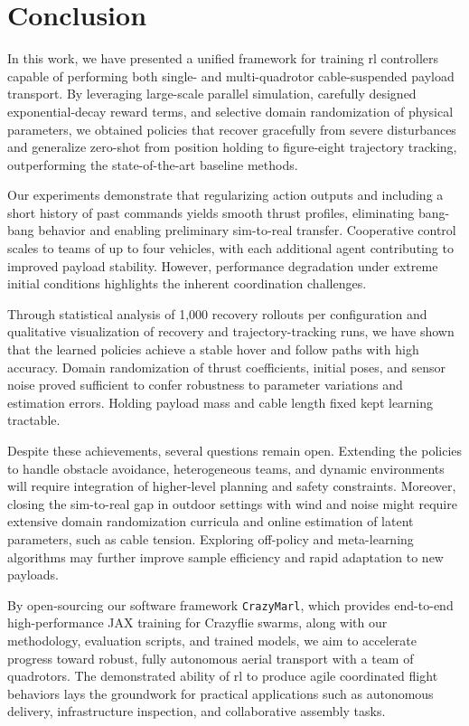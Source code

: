 \chapter{Conclusion}

In this work, we have presented a unified framework for training \gls{rl} controllers capable of performing both single- and multi-quadrotor cable-suspended payload transport. By leveraging large-scale parallel simulation, carefully designed exponential-decay reward terms, and selective domain randomization of physical parameters, we obtained policies that recover gracefully from severe disturbances and generalize zero-shot from position holding to figure-eight trajectory tracking, outperforming the state-of-the-art baseline methods.

Our experiments demonstrate that regularizing action outputs and including a short history of past commands yields smooth thrust profiles, eliminating bang-bang behavior and enabling preliminary sim-to-real transfer. Cooperative control scales to teams of up to four vehicles, with each additional agent contributing to improved payload stability. However, performance degradation under extreme initial conditions highlights the inherent coordination challenges.

Through statistical analysis of 1,000 recovery rollouts per configuration and qualitative visualization of recovery and trajectory-tracking runs, we have shown that the learned policies achieve a stable hover and follow paths with high accuracy. Domain randomization of thrust coefficients, initial poses, and sensor noise proved sufficient to confer robustness to parameter variations and estimation errors. Holding payload mass and cable length fixed kept learning tractable.

Despite these achievements, several questions remain open. Extending the policies to handle obstacle avoidance, heterogeneous teams, and dynamic environments will require integration of higher-level planning and safety constraints. Moreover, closing the sim-to-real gap in outdoor settings with wind and noise might require extensive domain randomization curricula and online estimation of latent parameters, such as cable tension. Exploring off-policy and meta-learning algorithms may further improve sample efficiency and rapid adaptation to new payloads.

By open-sourcing our software framework \texttt{CrazyMarl}, which provides end-to-end high-performance JAX training for Crazyflie swarms, along with our methodology, evaluation scripts, and trained models, we aim to accelerate progress toward robust, fully autonomous aerial transport with a team of quadrotors. The demonstrated ability of \gls{rl} to produce agile coordinated flight behaviors lays the groundwork for practical applications such as autonomous delivery, infrastructure inspection, and collaborative assembly tasks.